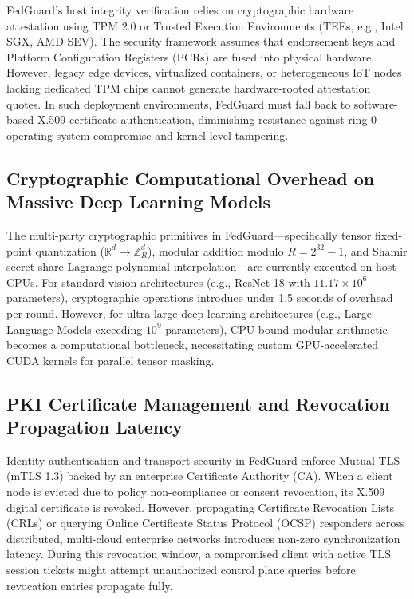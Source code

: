 FedGuard's host integrity verification relies on cryptographic hardware attestation using TPM 2.0 or Trusted Execution Environments (TEEs, e.g., Intel SGX, AMD SEV). The security framework assumes that endorsement keys and Platform Configuration Registers (PCRs) are fused into physical hardware. However, legacy edge devices, virtualized containers, or heterogeneous IoT nodes lacking dedicated TPM chips cannot generate hardware-rooted attestation quotes. In such deployment environments, FedGuard must fall back to software-based X.509 certificate authentication, diminishing resistance against ring-0 operating system compromise and kernel-level tampering.

\subsection{Cryptographic Computational Overhead on Massive Deep Learning Models}

The multi-party cryptographic primitives in FedGuard—specifically tensor fixed-point quantization ($\mathbb{R}^d \to \mathbb{Z}_R^d$), modular addition modulo $R = 2^{32}-1$, and Shamir secret share Lagrange polynomial interpolation—are currently executed on host CPUs. For standard vision architectures (e.g., ResNet-18 with $11.17 \times 10^6$ parameters), cryptographic operations introduce under 1.5 seconds of overhead per round. However, for ultra-large deep learning architectures (e.g., Large Language Models exceeding $10^9$ parameters), CPU-bound modular arithmetic becomes a computational bottleneck, necessitating custom GPU-accelerated CUDA kernels for parallel tensor masking.

\subsection{PKI Certificate Management and Revocation Propagation Latency}

Identity authentication and transport security in FedGuard enforce Mutual TLS (mTLS 1.3) backed by an enterprise Certificate Authority (CA). When a client node is evicted due to policy non-compliance or consent revocation, its X.509 digital certificate is revoked. However, propagating Certificate Revocation Lists (CRLs) or querying Online Certificate Status Protocol (OCSP) responders across distributed, multi-cloud enterprise networks introduces non-zero synchronization latency. During this revocation window, a compromised client with active TLS session tickets might attempt unauthorized control plane queries before revocation entries propagate fully.

